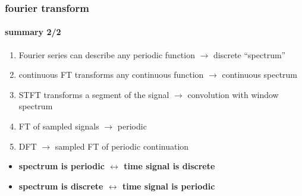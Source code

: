 	\begin{frame}\frametitle{fourier transform}\framesubtitle{summary 2/2}
        \begin{enumerate}
            \item   Fourier series can describe any periodic function $\rightarrow$ discrete ``spectrum''
            \item   continuous FT transforms any continuous function $\rightarrow$ continuous spectrum
            \item   STFT transforms a segment of the signal $\rightarrow$ convolution with window spectrum
            \item   FT of sampled signals $\rightarrow$ periodic
            \item   DFT $\rightarrow$ sampled FT of periodic continuation
        \end{enumerate}
            \pause
        \begin{itemize}
            \item   \textbf{spectrum is periodic $\leftrightarrow$ time signal is discrete}
            \item   \textbf{spectrum is discrete $\leftrightarrow$ time signal is periodic}
        \end{itemize}
	\end{frame}	

